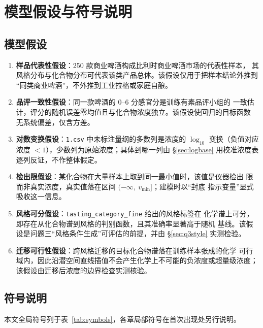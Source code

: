 \section{模型假设与符号说明}

\subsection{模型假设}

\begin{enumerate}[label=\textbf{假设\arabic*.},leftmargin=3.4em,itemsep=2pt]
\item \textbf{样品代表性假设}：250 款商业啤酒构成比利时商业啤酒市场的代表性样本，
      其风格分布与化合物分布可代表该类产品总体。该假设仅用于把样本结论外推到
      “同类商业啤酒”，不外推到工业拉格或家庭自酿。
\item \textbf{品评一致性假设}：同一款啤酒的 0--6 分感官分是训练有素品评小组的
      一致估计，评分的随机误差零均值且与化合物浓度独立。该假设使回归的目标函数
      无系统偏差，仅含方差。
\item \textbf{对数变换假设}：\texttt{1.csv} 中未标注量纲的多数列是浓度的
      $\log_{10}$ 变换（负值对应浓度 $<1$），少数列为原始浓度；具体到哪一列由
      \S\ref{sec:logbase} 用校准浓度表逐列反证，不作整体假定。
\item \textbf{检出限假设}：某化合物在大量样本上取到同一最小值时，该值是仪器检出
      限而非真实浓度，真实值落在区间 $(-\infty,\ v_{\min}]$；建模时以“封底
      指示变量”显式吸收这一信息。
\item \textbf{风格可分假设}：\texttt{tasting\_category\_fine} 给出的风格标签在
      化学谱上可分，即存在从化合物谱到风格的判别函数，且其准确率显著高于随机
      基线。该假设是问题三“风格条件生成”可评估的前提，并由
      \S\ref{sec:q3style} 实测检验。
\item \textbf{迁移可行性假设}：跨风格迁移的目标化合物谱落在训练样本张成的化学
      可行域内，因此沿潜空间直线插值不会产生化学上不可能的负浓度或超量级浓度；
      该假设由迁移后浓度的边界检查实测核验。
\end{enumerate}

\subsection{符号说明}

本文全局符号列于表~\ref{tab:symbols}，各章局部符号在首次出现处另行说明。

